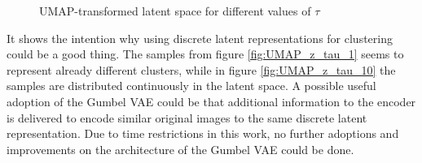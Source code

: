 \documentclass[12pt,DIV14,BCOR12mm,a4paper,footexclude,headinclude,halfparskip-,twoside,openright,cleardoubleempty,idxtotoc,bibtotoc,listtotoc,abstracton]{scrreprt} %
\numberwithin{equation}{chapter}
\begin{document}
	\begin{figure}[htb!]
	\centering
	\qquad
	\qquad
	\qquad
	\qquad
	\caption{UMAP-transformed latent space for different values of $\tau$}
	\label{fig:Different_GumbelTemperatures_UMAP}
\end{figure}
It shows the intention why using discrete latent representations for clustering could be a good thing. The samples from figure \ref{fig:UMAP_z_tau_1} seems to represent already different clusters, while in figure \ref{fig:UMAP_z_tau_10} the samples are distributed continuously in the latent space. A possible useful adoption of the Gumbel VAE could be that additional information to the encoder is delivered to encode similar original images to the same discrete latent representation. Due to time restrictions in this work, no further adoptions and improvements on the architecture of the Gumbel VAE could be done.\\
\end{document}
